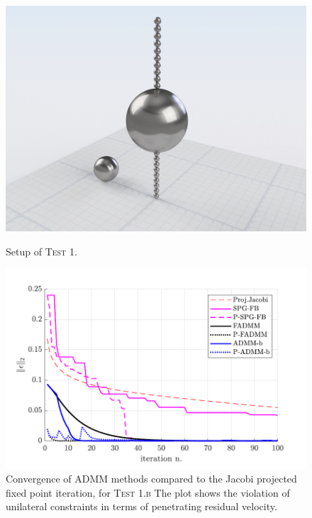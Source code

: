 \documentclass[AMA,STIX1COL]{WileyNJD-v2}
\begin{document}
\begin{figure}[!tbp]
  \centering
  \begin{minipage}[t]{0.48\textwidth}
    \includegraphics[width=\textwidth]{pics/t6_snapshot.png}
    \caption{Setup of \textsc{Test 1}.}
		\label{fig:t6_snapshot}
  \end{minipage}
  \hfill
  \begin{minipage}[t]{0.48\textwidth}
    \includegraphics[width=\textwidth]{pics/t6_convergence_b.pdf}
    \caption{Convergence of ADMM methods compared to the Jacobi projected fixed point iteration, for \textsc{Test 1.b} 
		The plot shows the violation of unilateral constraints in terms of penetrating residual velocity. }
		\label{fig:t6_convergence_b}
  \end{minipage}
\end{figure}
\end{document}
